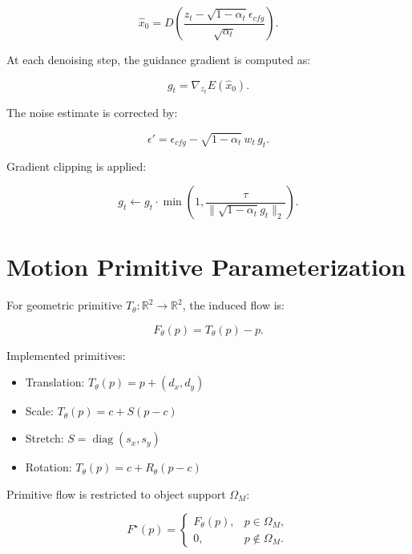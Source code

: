 \documentclass[11pt,a4paper]{article}
\begin{document}
\begin{equation}
\hat{x}_0 =
D\left(
\frac{z_t-\sqrt{1-\alpha_t}\epsilon_{cfg}}{\sqrt{\alpha_t}}
\right).
\end{equation}

At each denoising step, the guidance gradient is computed as:

\begin{equation}
g_t = \nabla_{z_t}E(\hat{x}_0).
\end{equation}

The noise estimate is corrected by:

\begin{equation}
\epsilon'
=
\epsilon_{cfg}
- \sqrt{1-\alpha_t}\,w_t\,g_t.
\end{equation}

Gradient clipping is applied:

\begin{equation}
g_t \leftarrow
g_t \cdot
\min\left(
1,
\frac{\tau}{\|\sqrt{1-\alpha_t}g_t\|_2}
\right).
\end{equation}

\section{Motion Primitive Parameterization}

For geometric primitive \(T_\theta:\mathbb{R}^2\rightarrow\mathbb{R}^2\), the induced flow is:

\begin{equation}
F_\theta(p)=T_\theta(p)-p.
\end{equation}

Implemented primitives:

\begin{itemize}
  \item Translation: \(T_\theta(p)=p+(d_x,d_y)\)
  \item Scale: \(T_\theta(p)=c+S(p-c)\)
  \item Stretch: \(S=\operatorname{diag}(s_x,s_y)\)
  \item Rotation: \(T_\theta(p)=c+R_\theta(p-c)\)
\end{itemize}

Primitive flow is restricted to object support \(\Omega_M\):

\begin{equation}
F^\star(p)=
\begin{cases}
F_\theta(p), & p\in\Omega_M,\\
0, & p\notin\Omega_M.
\end{cases}
\end{equation}
\end{document}
